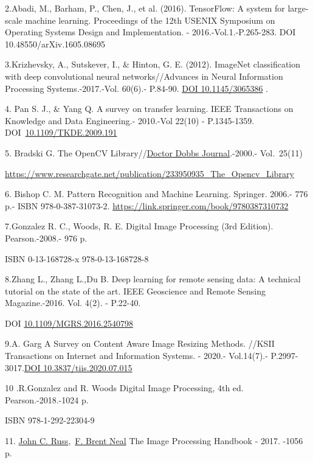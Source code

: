 {{2.Abadi, M., Barham, P., Chen, J., et al. (2016). TensorFlow: A system
for large-scale machine learning. Proceedings of the 12th USENIX
Symposium on Operating Systems Design and Implementation. -
2016.-Vol.1.-P.265-283. DOI 10.48550/arXiv.1605.08695

3.Krizhevsky, A., Sutskever, I., \& Hinton, G. E. (2012). ImageNet
classification with deep convolutional neural networks//Advances in
Neural Information Processing Systems.-2017.-Vol. 60(6).- P.84-90.
\href{https://dl.acm.org/doi/10.1145/3065386}{DOI 10.1145/3065386} .

4. Pan S. J., \& Yang Q. A survey on transfer learning. IEEE
Transactions on Knowledge and Data Engineering.- 2010.-Vol 22(10) -
P.1345-1359.
DOI~\href{https://doi.org/10.1109/TKDE.2009.191}{10.1109/TKDE.2009.191}

5. Bradski G. The OpenCV
Library//\href{https://www.researchgate.net/journal/Doctor-Dobbs-Journal-1044-789X?_tp=eyJjb250ZXh0Ijp7ImZpcnN0UGFnZSI6InB1YmxpY2F0aW9uIiwicGFnZSI6InB1YmxpY2F0aW9uIn19}{Doctor
Dobbs Journal}.-2000.- Vol.~25(11)

\url{https://www.researchgate.net/publication/233950935_The_Opencv_Library}

6. Bishop C. M. Pattern Recognition and Machine Learning. Springer.
2006.- 776 p.- ISBN 978-0-387-31073-2.
\url{https://link.springer.com/book/9780387310732}

7.Gonzalez R. C., Woods, R. E. Digital Image Processing (3rd Edition).
Pearson.-2008.- 976 p.

ISBN 0-13-168728-x 978-0-13-168728-8

8.Zhang L., Zhang L.,Du B. Deep learning for remote sensing data: A
technical tutorial on the state of the art. IEEE Geoscience and Remote
Sensing Magazine.-2016. Vol. 4(2). - P.22-40.

DOI
\href{http://dx.doi.org/10.1109/MGRS.2016.2540798}{10.1109/MGRS.2016.2540798}

9.A. Garg A Survey on Content Aware Image Resizing Methods. //KSII
Transactions on Internet and Information Systems. - 2020.- Vol.14(7).-
P.2997-3017.\href{https://doi.org/10.3837/tiis.2020.07.015}{DOI
10.3837/tiis.2020.07.015}

10 .R.Gonzalez and R. Woods Digital Image Processing, 4th ed.
Pearson.-2018.-1024 p.

ISBN 978-1-292-22304-9

11.
\href{https://www.google.kz/search?hl=ru&tbo=p&tbm=bks&q=inauthor:\%22John+C.+Russ\%22}{John
C.
Russ},~\href{https://www.google.kz/search?hl=ru&tbo=p&tbm=bks&q=inauthor:\%22F.+Brent+Neal\%22}{F.
Brent Neal} The Image Processing Handbook - 2017. -1056 p.

}}
